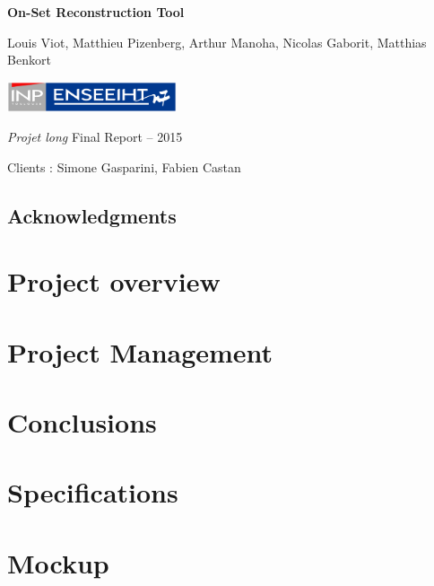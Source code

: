 \documentclass[a4paper]{report}
\title{\mytitle}
\author{\myauthor}
\date{From January, 19\up{th} to March, 13\up{th}}
\def\mytitle{On-Set Reconstruction Tool}
\def\myauthor{Louis Viot, Matthieu Pizenberg, Arthur Manoha, Nicolas
  Gaborit, Matthias Benkort}
\begin{document}
\begin{titlepage}
\centering

\null
\vfill

{\Huge\sffamily\bfseries\mytitle\par}
\vspace{1cm}
{\Large\myauthor\par}

\vfill
\vfill

\includegraphics[width=5cm]{img/inpn7.pdf}

\vfill

{\Large \emph{Projet long} Final Report -- 2015\par%
  Clients : Simone Gasparini, Fabien Castan\par}


\end{titlepage}

\tableofcontents

\newpage

\thispagestyle{empty}
\null
\vfill

\section*{Acknowledgments}


\chapter{Project overview}


\chapter{Project Management}


\chapter{Conclusions}


\appendix
\chapter{Specifications}
\chapter{Mockup}
\end{document}
